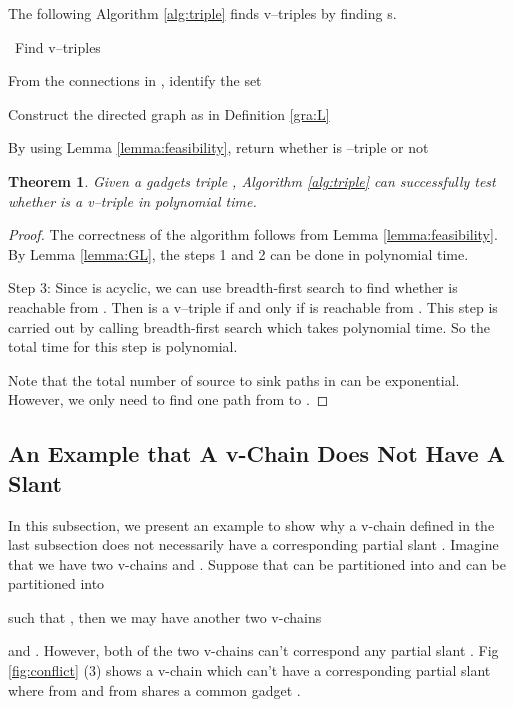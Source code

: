 \documentclass[11pt]{article}
\newtheorem{theorem}[figure]{Theorem}
\begin{document}
The following Algorithm \ref{alg:triple}  finds
v--triples  by finding s.

\begin{algorithm}[htb]
\caption{~Find v--triples}
\label{alg:triple}


From the connections in , identify the set \;

Construct the directed graph  as in Definition \ref{gra:L}\;

By using Lemma \ref{lemma:feasibility},
return whether  is --triple or not\;
\end{algorithm}

\begin{theorem}\label{thm:time}
Given a gadgets triple ,
Algorithm \ref{alg:triple} can successfully test whether 
is a v--triple  in polynomial time.
\end{theorem}

\begin{proof}
The correctness of the algorithm follows from Lemma
\ref{lemma:feasibility}. By Lemma \ref{lemma:GL}, the steps
1 and 2 can be done in polynomial time.


Step 3:
Since  is acyclic,
we can use breadth-first search to find whether
 is reachable from .
Then  is
a v--triple if and only if
 is reachable from .
This step is carried out by calling breadth-first search which
takes polynomial time.
So the total time for this step is polynomial.

Note that the total number of source to sink paths in  can be exponential.
However, we only
need to find one path from  to .

\end{proof}

\subsection{An Example that A v-Chain Does Not Have
A Slant }\label{sec:conflict-rel}
In this subsection, we present an example to show
why a v-chain defined in the last subsection does not necessarily
have a corresponding partial slant .
Imagine that we have two v-chains  and .
Suppose that  can be partitioned into
 and
 can be partitioned into

such that ,
then we may have another two v-chains

and .
However, both of the two v-chains can't correspond any partial slant .
Fig \ref{fig:conflict} (3) shows a v-chain 
which can't have a corresponding partial slant  where
 from  and  from  shares a common gadget .
\end{document}
